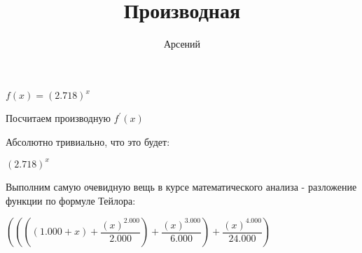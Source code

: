 \documentclass[a4paper,12pt]{article}
\author{\LARGEМерзляков Арсений}
\title{Производная}
\begin{document}
\maketitle
\begin{flushleft}
\Large
$f(x) = (2.718)^{x}$

Посчитаем производную $f^{'}(x)$

Абсолютно тривиально, что это будет:

$(2.718)^{x}$

Выполним самую очевидную вещь в курсе математического анализа - разложение функции по формуле Тейлора: 

$((((1.000+x)+ \dfrac{(x)^{2.000}}{2.000} )+ \dfrac{(x)^{3.000}}{6.000} )+ \dfrac{(x)^{4.000}}{24.000} )$

\end{flushleft}
\end{document}
